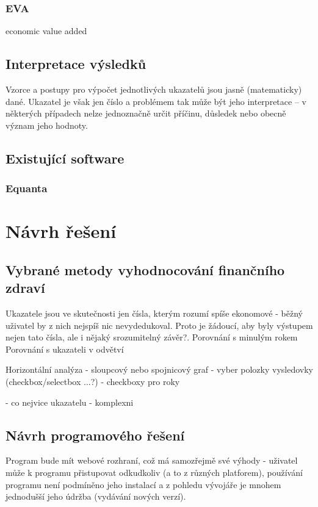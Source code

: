 \subsection{EVA}
economic value added



\section{Interpretace výsledků}
Vzorce a postupy pro výpočet jednotlivých ukazatelů jsou jasně (matematicky) dané. Ukazatel je však jen číslo a problémem tak může být jeho interpretace -- v některých případech nelze jednoznačně určit příčinu, důsledek nebo obecně význam jeho hodnoty. 

\section{Existující software}
\subsection{Equanta\sffamily\textregistered}

\chapter{Návrh řešení}
\section{Vybrané metody vyhodnocování finančního zdraví}
Ukazatele jsou ve skutečnosti jen čísla, kterým rozumí spíše ekonomové - běžný uživatel by z nich nejspíš nic nevydedukoval. Proto je žádoucí, aby byly výstupem nejen tato čísla, ale i nějaký srozumitelný závěr?.
Porovnání s minulým rokem
Porovnání s ukazateli v odvětví

Horizontální analýza
- sloupcový nebo spojnicový graf
- vyber polozky vysledovky (checkbox/selectbox ...?)
- checkboxy pro roky

- co nejvice ukazatelu - komplexni

\section{Návrh programového řešení}
Program bude mít webové rozhraní, což má samozřejmě své výhody - uživatel může k programu přistupovat odkudkoliv (a to z různých platforem), používání programu není podmíněno jeho instalací a z pohledu vývojáře je mnohem jednodušší jeho údržba (vydávání nových verzí).

